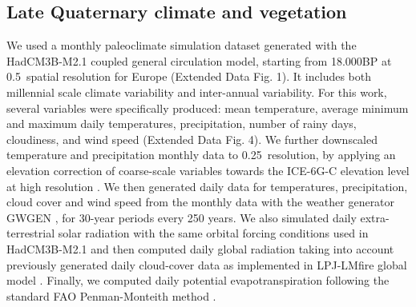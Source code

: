 \documentclass[pdflatex, sn-nature]{sn-jnl}%
\begin{document}
\subsection{Late Quaternary climate and vegetation}\label{paleodata}
We used a monthly paleoclimate simulation dataset \cite{Armstrong2019} generated with the HadCM3B-M2.1 coupled general circulation model, starting from 18.000BP at 0.5\degree~spatial resolution for Europe (Extended Data Fig. 1). It includes both millennial scale climate variability and inter-annual variability. For this work, several variables were specifically produced: mean temperature, average minimum and maximum daily temperatures, precipitation, number of rainy days, cloudiness, and wind speed (Extended Data Fig. 4). We further downscaled temperature and precipitation monthly data to 0.25\degree~resolution, by applying an elevation correction of coarse-scale variables towards the ICE-6G-C elevation level at high resolution \cite{Peltier2015}.  
We then generated daily data for temperatures, precipitation, cloud cover and wind speed from  the monthly data with the weather generator GWGEN \cite{Sommer2017}, for 30-year periods every 250 years. We also simulated daily extra-terrestrial solar radiation with the same orbital forcing conditions used in HadCM3B-M2.1 \cite{Armstrong2019} and then computed daily global radiation taking into account previously generated daily cloud-cover data as implemented in LPJ-LMfire global model \cite{Pfeiffer2013}. Finally, we computed daily potential evapotranspiration following the standard FAO Penman-Monteith method \cite{Allen1998}.  
\end{document}
